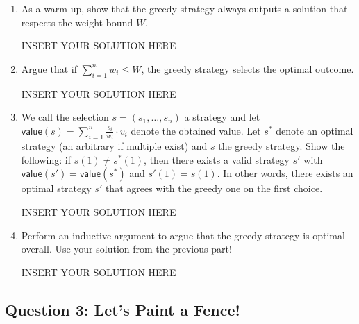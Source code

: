 \begin{enumerate}
    \item As a warm-up, show that the greedy strategy always outputs a solution that respects the weight bound $W$.
\begin{solution}   INSERT YOUR SOLUTION HERE   \end{solution}

    \item Argue that if $\sum_{i=1}^n w_i \leq W$, the greedy strategy selects the optimal outcome.
\begin{solution}   INSERT YOUR SOLUTION HERE   \end{solution}


    \item We call the selection $s = (s_1,\ldots,s_n)$ a strategy and let 
    $\mathsf{value}(s) = \sum_{i=1}^n \frac{s_i}{w_i} \cdot v_i$ 
    denote the obtained value. Let $s^*$ denote an optimal strategy (an arbitrary if multiple exist) and $s$ the greedy strategy.
    Show the following: if $s(1) \neq s^*(1)$, then there exists a valid strategy $s'$ with $\mathsf{value}(s') = \mathsf{value}(s^*)$ and $s'(1) = s(1)$. In other words, there exists an optimal strategy $s'$ that agrees with the greedy one on the first choice.
\begin{solution}   INSERT YOUR SOLUTION HERE   \end{solution}

    \item Perform an inductive argument to argue that the greedy strategy is optimal overall. Use your solution from the previous part!
\begin{solution}   INSERT YOUR SOLUTION HERE   \end{solution}
\end{enumerate}




\subsection*{Question 3: Let's Paint a Fence!}


